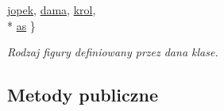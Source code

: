 \begin{DoxyCompactItemize}
\hyperlink{class_karta_a7f71c15a03e9b8d4103c8734f2ec1f1bafab91ae991271df7b8a10493f2dbf8ca}{jopek}, 
\hyperlink{class_karta_a7f71c15a03e9b8d4103c8734f2ec1f1ba6bfc4dcc0142d6af035035bc829ed7dd}{dama}, 
\hyperlink{class_karta_a7f71c15a03e9b8d4103c8734f2ec1f1bacab291fdab9436f2c9f66c953b348184}{krol}, 
\\*
\hyperlink{class_karta_a7f71c15a03e9b8d4103c8734f2ec1f1ba1b587d6134aad8a4671ee38325450d7e}{as}
 \}
\begin{DoxyCompactList}\small\item\em Rodzaj figury definiowany przez dana klase. \end{DoxyCompactList}\end{DoxyCompactItemize}
\subsection*{Metody publiczne}
